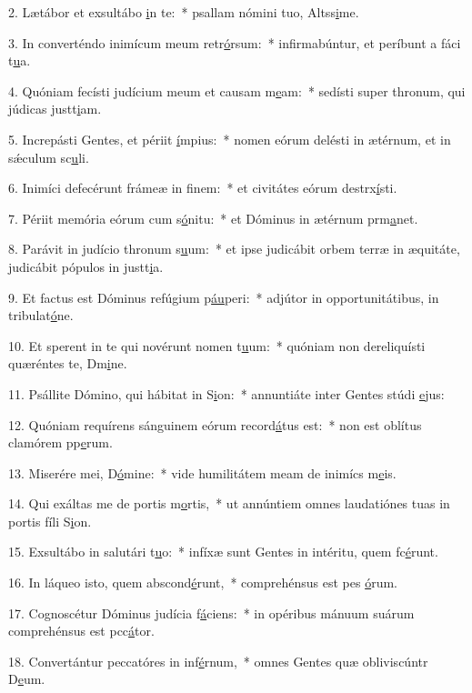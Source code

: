 2. Lætábor et exsultábo \uline{i}n te:~* psallam nómini tuo, Altss\uline{i}me.\par 
3. In converténdo inimícum meum retr\uline{ó}rsum:~* infirmabúntur, et períbunt a fáci t\uline{u}a.\par 
4. Quóniam fecísti judícium meum et causam m\uline{e}am:~* sedísti super thronum, qui júdicas justt\uline{i}am.\par 
5. Increpásti Gentes, et périit \uline{í}mpius:~* nomen eórum delésti in ætérnum, et in sǽculum sc\uline{u}li.\par 
6. Inimíci defecérunt frámeæ in f\uline{i}nem:~* et civitátes eórum destrx\uline{í}sti.\par 
7. Périit memória eórum cum s\uline{ó}nitu:~* et Dóminus in ætérnum prm\uline{a}net.\par 
8. Parávit in judício thronum s\uline{u}um:~* et ipse judicábit orbem terræ in æquitáte, judicábit pópulos in justt\uline{i}a.\par 
9. Et factus est Dóminus refúgium p\uline{áu}peri:~* adjútor in opportunitátibus, in tribulat\uline{ó}ne.\par 
10. Et sperent in te qui novérunt nomen t\uline{u}um:~* quóniam non dereliquísti quæréntes te, Dm\uline{i}ne.\par 
11. Psállite Dómino, qui hábitat in S\uline{i}on:~* annuntiáte inter Gentes stúdi \uline{e}jus:\par 
12. Quóniam requírens sánguinem eórum record\uline{á}tus est:~* non est oblítus clamórem pp\uline{e}rum.\par 
13. Miserére mei, D\uline{ó}mine:~* vide humilitátem meam de inimícs m\uline{e}is.\par 
14. Qui exáltas me de portis m\uline{o}rtis,~* ut annúntiem omnes laudatiónes tuas in portis fíli S\uline{i}on.\par 
15. Exsultábo in salutári t\uline{u}o:~* infíxæ sunt Gentes in intéritu, quem fc\uline{é}runt.\par 
16. In láqueo isto, quem abscond\uline{é}runt,~* comprehénsus est pes \uline{ó}rum.\par 
17. Cognoscétur Dóminus judícia f\uline{á}ciens:~* in opéribus mánuum suárum comprehénsus est pcc\uline{á}tor.\par 
18. Convertántur peccatóres in inf\uline{é}rnum,~* omnes Gentes quæ obliviscúntr D\uline{e}um.\par 
